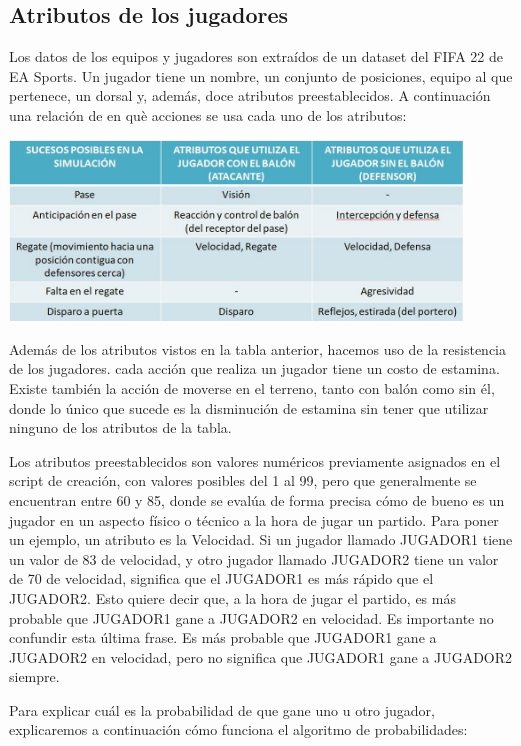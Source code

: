 \documentclass{article}
\begin{document}
\subsection{Atributos de los jugadores}
Los datos de los equipos y jugadores son extraídos de un dataset del FIFA 22 de EA Sports. Un jugador tiene un nombre, un conjunto de posiciones, equipo al que pertenece, un dorsal y, además, doce atributos preestablecidos. A continuación una relación de en què acciones se usa cada uno de los atributos:

\includegraphics*[width=0.9\textwidth]{attributed_table.jpg}
\bigskip

Además de los atributos vistos en la tabla anterior, hacemos uso de la resistencia de los jugadores. cada acción que realiza un jugador tiene un costo de estamina. Existe también la acción de moverse en  el terreno, tanto con balón como sin él, donde lo único que sucede es la disminución de estamina sin tener que utilizar ninguno de los atributos de la tabla.

Los atributos preestablecidos son valores numéricos previamente asignados en el 
script de creación, con valores posibles del 1 al 99, pero que generalmente se
encuentran entre 60 y 85, donde se evalúa de forma precisa cómo de bueno es un
jugador en un aspecto físico o técnico a la hora de jugar un partido.
Para poner un ejemplo, un atributo es la Velocidad. Si un jugador llamado JUGADOR1
tiene un valor de 83 de velocidad, y otro jugador llamado JUGADOR2 tiene un valor de
70 de velocidad, significa que el JUGADOR1 es más rápido que el JUGADOR2. Esto quiere decir que, a la hora de jugar el partido, es más probable que JUGADOR1 gane a
JUGADOR2 en velocidad.
Es importante no confundir esta última frase. Es más probable que JUGADOR1 gane a
JUGADOR2 en velocidad, pero no significa que JUGADOR1 gane a JUGADOR2 siempre.

Para explicar cuál es la probabilidad de que gane uno u otro jugador,
explicaremos a continuación cómo funciona el algoritmo de probabilidades:
\end{document}
